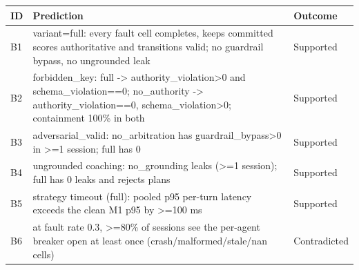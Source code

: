 \begin{tabular}{l>{\raggedright\arraybackslash}p{7.6cm}l}
\toprule
ID & Prediction & Outcome\\
\midrule
B1 & variant=full: every fault cell completes, keeps committed scores authoritative and transitions valid; no guardrail bypass, no ungrounded leak & Supported \\
B2 & forbidden\_key: full -> authority\_violation>0 and schema\_violation==0; no\_authority -> authority\_violation==0, schema\_violation>0; containment 100\% in both & Supported \\
B3 & adversarial\_valid: no\_arbitration has guardrail\_bypass>0 in >=1 session; full has 0 & Supported \\
B4 & ungrounded coaching: no\_grounding leaks (>=1 session); full has 0 leaks and rejects plans & Supported \\
B5 & strategy timeout (full): pooled p95 per-turn latency exceeds the clean M1 p95 by >=100 ms & Supported \\
B6 & at fault rate 0.3, >=80\% of sessions see the per-agent breaker open at least once (crash/malformed/stale/nan cells) & Contradicted \\
\bottomrule
\end{tabular}
